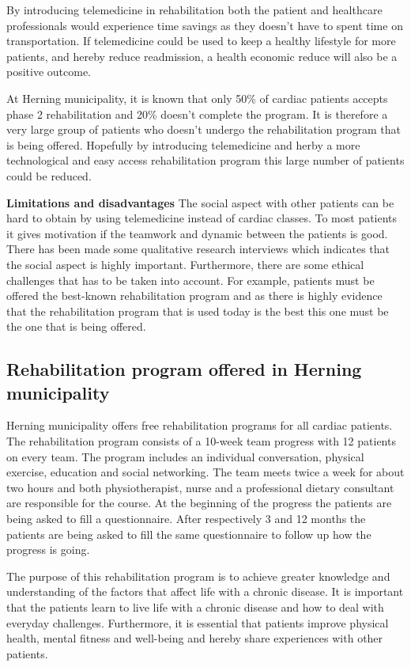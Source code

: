 By introducing telemedicine in rehabilitation both the patient and healthcare professionals would experience time savings as they doesn’t have to spent time on transportation. If telemedicine could be used to keep a healthy lifestyle for more patients, and hereby reduce readmission, a health economic reduce will also be a positive outcome. 

At Herning municipality, it is known that only 50\% of cardiac patients accepts phase 2 rehabilitation and 20\% doesn’t complete the program. It is therefore a very large group of patients who doesn’t undergo the rehabilitation program that is being offered. Hopefully by introducing telemedicine and herby a more technological and easy access rehabilitation program this large number of patients could be reduced. 

\textbf{Limitations and disadvantages} \newline
The social aspect with other patients can be hard to obtain by using telemedicine instead of cardiac classes. To most patients it gives motivation if the teamwork and dynamic between the patients is good. There has been made some qualitative research interviews which indicates that the social aspect is highly important. Furthermore, there are some ethical challenges that has to be taken into account. For example, patients must be offered the best-known rehabilitation program and as there is highly evidence that the rehabilitation program that is used today is the best this one must be the one that is being offered.     

\subsection{Rehabilitation program offered in Herning municipality}
Herning municipality offers free rehabilitation programs for all cardiac patients. The rehabilitation program consists of a 10-week team progress with 12 patients on every team. The program includes an individual conversation, physical exercise, education and social networking. The team meets twice a week for about two hours and both physiotherapist, nurse and a professional dietary consultant are responsible for the course. At the beginning of the progress the patients are being asked to fill a questionnaire. After respectively 3 and 12 months the patients are being asked to fill the same questionnaire to follow up how the progress is going. 

The purpose of this rehabilitation program is to achieve greater knowledge and understanding of the factors that affect life with a chronic disease. It is important that the patients learn to live life with a chronic disease and how to deal with everyday challenges. Furthermore, it is essential that patients improve physical health, mental fitness and well-being and hereby share experiences with other patients. 

